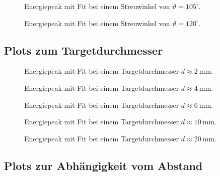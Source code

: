 \documentclass[slug=CS, room=Andreas-Schubert-Bau\,\ Labor\ 406,
supervisor=Juliane\ Volkmer, coursedate=29.\ 11.\ 2019]{../../Lab_Report_LaTeX/lab_report}
\begin{document}
\begin{figure}[H]\centering
  
  \caption{Energiepeak mit Fit bei einem Streuwinkel von \(\vartheta = 105^\circ\).}
  \label{fig:105}
\end{figure}

\begin{figure}[H]\centering
  
  \caption{Energiepeak mit Fit bei einem Streuwinkel von \(\vartheta = 120^\circ\).}
  \label{fig:120}
\end{figure}

\subsection{Plots zum Targetdurchmesser}
\label{sec:andiplot}

\begin{figure}[H]\centering
  
  \caption{Energiepeak mit Fit bei einem Targetdurchmesser \(d \approx \SI{2}{\milli\metre}\).}
  \label{fig:dicke-2}
\end{figure}

\begin{figure}[H]\centering
  
  \caption{Energiepeak mit Fit bei einem Targetdurchmesser \(d \approx \SI{4}{\milli\metre}\).}
  \label{fig:dicke-4}
\end{figure}

\begin{figure}[H]\centering
  
  \caption{Energiepeak mit Fit bei einem Targetdurchmesser \(d \approx \SI{6}{\milli\metre}\).}
  \label{fig:dicke-6}
\end{figure}

\begin{figure}[H]\centering
  
  \caption{Energiepeak mit Fit bei einem Targetdurchmesser \(d \approx \SI{10}{\milli\metre}\).}
  \label{fig:dicke-10}
\end{figure}

\begin{figure}[H]\centering
  
  \caption{Energiepeak mit Fit bei einem Targetdurchmesser \(d \approx \SI{20}{\milli\metre}\).}
  \label{fig:dicke-20}
\end{figure}

\subsection{Plots zur Abh\"angigkeit vom Abstand}
\label{sec:anabplot}
\end{document}
